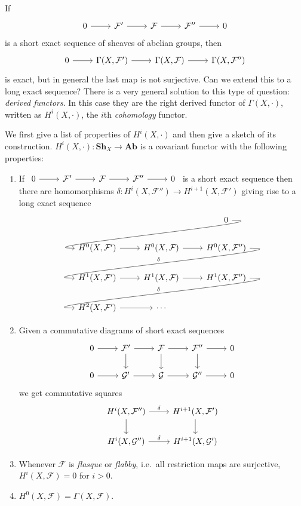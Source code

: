 \documentclass[a4paper]{article}
\renewcommand{\c}[1]{\mathbf{#1}} %
\newcommand{\sh}[1]{\mathcal{#1}} %
\begin{document}
If
\[
  \begin{tikzcd}
    0 \ar[r] & \sh F' \ar[r] & \sh F \ar[r] & \sh F'' \ar[r] & 0
  \end{tikzcd}
\]
is a short exact sequence of sheaves of abelian groups, then
\[
  \begin{tikzcd}
    0 \ar[r] & \Gamma(X, \sh F') \ar[r] & \Gamma(X, \sh F) \ar[r] & \Gamma(X, \sh F'')
  \end{tikzcd}
\]
is exact, but in general the last map is not surjective. Can we extend this to a long exact sequence? There is a very general solution to this type of question: \emph{derived functors}. In this case they are the right derived functor of \(\Gamma(X, \cdot)\), written as \(H^i(X, \cdot)\), the \(i\)th \emph{cohomology} functor.

We first give a list of properties of \(H^i(X, \cdot)\) and then give a sketch of its construction. \(H^i(X, \cdot): \c{Sh}_X \to \c{Ab}\) is a covariant functor with the following properties:
\begin{enumerate}
\item If \(\begin{tikzcd}
    0 \ar[r] & \sh F' \ar[r] & \sh F \ar[r] & \sh F'' \ar[r] & 0
  \end{tikzcd}
  \) is a short exact sequence then there are homomorphisms \(\delta: H^i(X, \sh F'') \to H^{i + 1}(X, \sh F')\) giving rise to a long exact sequence
  \[
    \begin{tikzcd}
      & & 0 \ar[dll, out=0, in=180, overlay] \\
      H^0(X, \sh F') \ar[r] & H^0(X, \sh F) \ar[r] & H^0(X, \sh F'') \ar[dll, "\delta"', out=0, in=180, overlay] \\
      H^1(X, \sh F') \ar[r] & H^1(X, \sh F) \ar[r] & H^1(X, \sh F'') \ar[dll, "\delta"', out=0, in=180, overlay] \\
      H^2(X, \sh F') \ar[r] & \cdots
    \end{tikzcd}
  \]
\item Given a commutative diagrams of short exact sequences
  \[
    \begin{tikzcd}
      0 \ar[r] & \sh F' \ar[r] \ar[d] & \sh F \ar[r] \ar[d] & \sh F'' \ar[r] \ar[d] & 0 \\
      0 \ar[r] & \sh G' \ar[r] & \sh G \ar[r] & \sh G'' \ar[r] & 0
    \end{tikzcd}
  \]
  we get commutative squares
  \[
    \begin{tikzcd}
      H^i(X, \sh F'') \ar[r, "\delta"] \ar[d] & H^{i + 1}(X, \sh F') \ar[d] \\
      H^i(X, \sh G'') \ar[r, "\delta"] & H^{i + 1}(X, \sh G')
    \end{tikzcd}
  \]
\item Whenever \(\sh F\) is \emph{flasque} or \emph{flabby}, i.e.\ all restriction maps are surjective, \(H^i(X, \sh F) = 0\) for \(i > 0\).
\item \(H^0(X, \sh F) = \Gamma(X, \sh F)\).
\end{enumerate}
\end{document}
